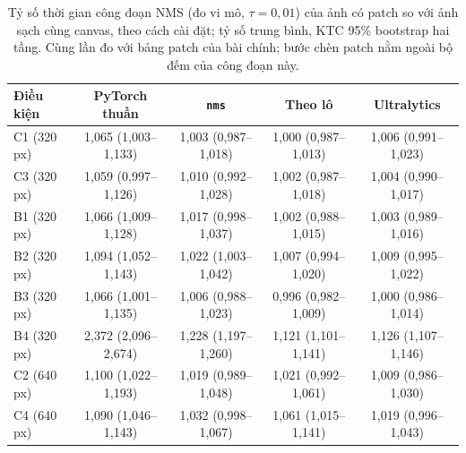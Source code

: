 \begin{table}[t]
\centering\small
\caption{Tỷ số thời gian công đoạn NMS (đo vi mô, $\tau=0{,}01$) của ảnh có patch so với ảnh sạch cùng canvas, theo cách cài đặt; tỷ số trung bình, KTC 95\% bootstrap hai tầng. Cùng lần đo với bảng patch của bài chính; bước chèn patch nằm ngoài bộ đếm của công đoạn này.}
\label{tab:impl}
\begin{tabular}{@{}lcccc@{}}
\toprule
Điều kiện & PyTorch thuần & \texttt{nms} & Theo lô & Ultralytics \\
\midrule
C1 (320 px) & 1,065 (1,003--1,133) & 1,003 (0,987--1,018) & 1,000 (0,987--1,013) & 1,006 (0,991--1,023) \\
C3 (320 px) & 1,059 (0,997--1,126) & 1,010 (0,992--1,028) & 1,002 (0,987--1,018) & 1,004 (0,990--1,017) \\
B1 (320 px) & 1,066 (1,009--1,128) & 1,017 (0,998--1,037) & 1,002 (0,988--1,015) & 1,003 (0,989--1,016) \\
B2 (320 px) & 1,094 (1,052--1,143) & 1,022 (1,003--1,042) & 1,007 (0,994--1,020) & 1,009 (0,995--1,022) \\
B3 (320 px) & 1,066 (1,001--1,135) & 1,006 (0,988--1,023) & 0,996 (0,982--1,009) & 1,000 (0,986--1,014) \\
B4 (320 px) & 2,372 (2,096--2,674) & 1,228 (1,197--1,260) & 1,121 (1,101--1,141) & 1,126 (1,107--1,146) \\
C2 (640 px) & 1,100 (1,022--1,193) & 1,019 (0,989--1,048) & 1,021 (0,992--1,061) & 1,009 (0,986--1,030) \\
C4 (640 px) & 1,090 (1,046--1,143) & 1,032 (0,998--1,067) & 1,061 (1,015--1,141) & 1,019 (0,996--1,043) \\
\bottomrule
\end{tabular}
\end{table}

